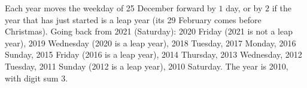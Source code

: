Each year moves the weekday of 25 December forward by $1$ day, or by $2$ if the year that has just started is a leap year (its 29 February comes before Christmas). Going back from 2021 (Saturday): 2020 Friday (2021 is not a leap year), 2019 Wednesday (2020 is a leap year), 2018 Tuesday, 2017 Monday, 2016 Sunday, 2015 Friday (2016 is a leap year), 2014 Thursday, 2013 Wednesday, 2012 Tuesday, 2011 Sunday (2012 is a leap year), 2010 Saturday. The year is 2010, with digit sum $\boxed{3}$.
